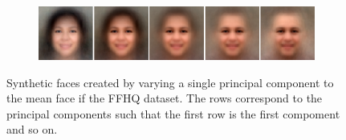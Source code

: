 \begin{figure} [h!]
\begin{subfigure}[b]{\textwidth}
    \end{subfigure}
    \begin{subfigure}[b]{\textwidth}
        \includegraphics[width=\textwidth]{fig/PCA/pca5}

    \end{subfigure}
    \caption{Synthetic faces created by varying a single principal component to the mean face if the FFHQ dataset. The rows correspond to the principal components such that the first row is the first compoment and so on. }
    \label{pca-components}
\end{figure}


